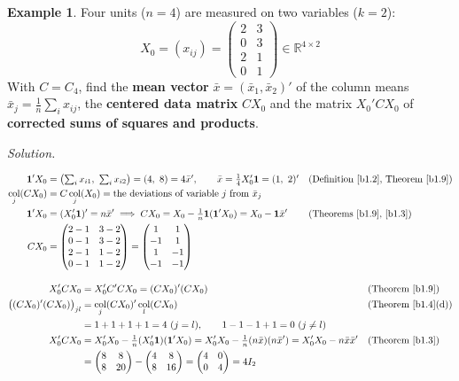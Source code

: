 \documentclass[12pt]{article}
\newcommand{\R}{\mathbb R}
\newcommand{\one}{\mathbf 1}
\DeclareMathOperator{\col}{col}
\theoremstyle{definition}
\newtheorem{example}[theorem]{Example}
\newcommand{\boardtop}{\vspace*{-\abovedisplayskip}}
\begin{document}
\begin{example}\label{b1.17}
Four units (\(n=4\)) are measured on two variables (\(k=2\)):
\[
X_0=(x_{ij})=\begin{pmatrix}2&3\\0&3\\2&1\\0&1\end{pmatrix}\in\R^{4\times2}
\]
With \(C=C_4\), find the \textbf{mean vector} \(\bar x=(\bar x_1,\bar x_2)'\) of the column means
\(\bar x_j=\frac1n\sum_ix_{ij}\), the \textbf{centered data matrix} \(CX_0\) and the matrix \(X_0'CX_0\) of
\textbf{corrected sums of squares and products}.
\end{example}
\textit{Solution.}
\begin{board}
\boardtop
\begin{align*}
\one'X_0&=\bigl(\textstyle\sum_ix_{i1},\ \sum_ix_{i2}\bigr)=(4,\ 8)=4\bar x',\qquad\bar x=\tfrac14X_0'\one=(1,\ 2)'
&&\text{(Definition~\ref{b1.2}, Theorem~\ref{b1.9})}\\
\col_j(CX_0)&=C\col_j(X_0)=\text{the deviations of variable }j\text{ from }\bar x_j\\
\one'X_0&=(X_0'\one)'=n\bar x'\implies CX_0=X_0-\tfrac1n\one(\one'X_0)=X_0-\one\bar x'&&\text{(Theorems~\ref{b1.9}, \ref{b1.3})}\\
CX_0&=\begin{pmatrix}2-1&3-2\\0-1&3-2\\2-1&1-2\\0-1&1-2\end{pmatrix}=\begin{pmatrix}1&1\\-1&1\\1&-1\\-1&-1\end{pmatrix}
\end{align*}
\end{board}
\begin{board}[\(X_0'CX_0\): \(C=C^2=C'C\) (Proposition~\ref{b1.15}):]
\boardtop
\begin{align*}
X_0'CX_0&=X_0'C'CX_0=(CX_0)'(CX_0)&&\text{(Theorem~\ref{b1.9})}\\
\bigl((CX_0)'(CX_0)\bigr)_{jl}&=\col_j(CX_0)'\col_l(CX_0)&&\text{(Theorem~\ref{b1.4}(d))}\\
&=1+1+1+1=4\ (j=l),\qquad1-1-1+1=0\ (j\ne l)\\
X_0'CX_0&=X_0'X_0-\tfrac1n(X_0'\one)(\one'X_0)=X_0'X_0-\tfrac1n(n\bar x)(n\bar x')=X_0'X_0-n\bar x\bar x'
&&\text{(Theorem~\ref{b1.3})}\\
&=\begin{pmatrix}8&8\\8&20\end{pmatrix}-\begin{pmatrix}4&8\\8&16\end{pmatrix}=\begin{pmatrix}4&0\\0&4\end{pmatrix}=4I_2
\end{align*}
\end{board}
\end{document}
